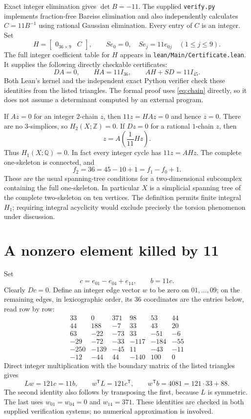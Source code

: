 \documentclass[11pt]{article}
\newcommand{\Z}{\mathbb Z}\newcommand{\Q}{\mathbb Q}
\begin{document}
Exact integer elimination gives $\det B=-11$. The supplied
\texttt{verify.py} implements fraction-free Bareiss elimination and
also independently calculates $C=11B^{-1}$ using rational Gaussian
elimination. Every entry of $C$ is an integer. Set
\[
 H=\begin{bmatrix}0_{36\times9}&C\end{bmatrix},\qquad
 S e_0=0,\quad S e_j=11e_{0j}\quad(1\le j\le9).
\]
The full integer coefficient table for $H$ appears in
\texttt{lean/Main/Certificate.lean}. It supplies the following
directly checkable certificates:
\begin{equation}\label{eq:chain}
 DA=0,\qquad HA=11I_{36},\qquad AH+SD=11I_{45}.
\end{equation}
Both Lean's kernel and the independent exact Python verifier check
these identities from the listed triangles. The formal proof uses
\eqref{eq:chain} directly, so it does not assume a determinant
computed by an external program.

If $Az=0$ for an integer $2$-chain $z$, then $11z=HAz=0$ and hence
$z=0$. There are no $3$-simplices, so $H_2(X;\Z)=0$.
If $Dz=0$ for a rational $1$-chain $z$, then
\[
 z=A\left(\frac{1}{11}Hz\right).
\]
Thus $H_1(X;\Q)=0$. In fact every integer cycle has $11z=AHz$.
The complete one-skeleton is connected, and
\[
 f_2=36=45-10+1=f_1-f_0+1.
\]
These are the usual spanning-tree conditions for a two-dimensional
subcomplex containing the full one-skeleton. In particular $X$ is
a simplicial spanning tree of the complete two-skeleton on ten
vertices. The definition permits finite integral $H_1$; requiring
integral acyclicity would exclude precisely the torsion phenomenon
under discussion.

\newpage
\section*{A nonzero element killed by 11}
Set
\[
 c=e_{01}-e_{04}+e_{14},\qquad b=11c.
\]
Clearly $Dc=0$. Define an integer edge vector $w$ to be zero on
$01,\ldots,09$; on the remaining edges, in lexicographic order,
its $36$ coordinates are the entries below, read row by row:
\[
\begin{array}{rrrrrr}
33&0&371&98&53&44\\
44&188&-7&33&43&20\\
63&-22&-73&33&-51&-6\\
-29&-72&-33&-117&-184&-55\\
-250&-139&-45&11&-43&-11\\
-12&-44&44&-140&100&0
\end{array}
\]
Direct integer multiplication with the boundary matrix of the
listed triangles gives
\begin{equation}\label{eq:torsion}
 Lw=121c=11b,\qquad
 w^{\mathsf T}L=121c^{\mathsf T},\qquad
 w^{\mathsf T}b=4081=121\cdot33+88.
\end{equation}
The second identity also follows by transposing the first, because
$L$ is symmetric. The last uses $w_{01}=w_{04}=0$ and
$w_{14}=371$. These identities are checked in both supplied
verification systems; no numerical approximation is involved.
\end{document}
